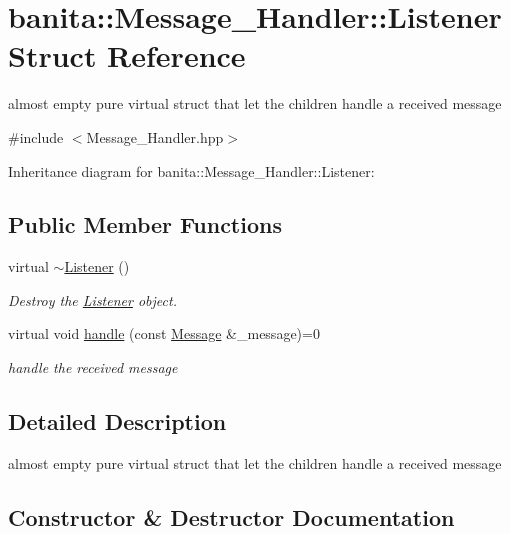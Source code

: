 \hypertarget{structbanita_1_1_message___handler_1_1_listener}{}\section{banita\+::Message\+\_\+\+Handler\+::Listener Struct Reference}
\label{structbanita_1_1_message___handler_1_1_listener}


almost empty pure virtual struct that let the children handle a received message  




{\ttfamily \#include $<$Message\+\_\+\+Handler.\+hpp$>$}



Inheritance diagram for banita\+::Message\+\_\+\+Handler\+::Listener\+:
\subsection*{Public Member Functions}
\begin{DoxyCompactItemize}
\item 
virtual \mbox{\hyperlink{structbanita_1_1_message___handler_1_1_listener_aa35b0cfb544e9353f6629d87fcc1799d}{$\sim$\+Listener}} ()
\begin{DoxyCompactList}\small\item\em Destroy the \mbox{\hyperlink{structbanita_1_1_message___handler_1_1_listener}{Listener}} object. \end{DoxyCompactList}\item 
virtual void \mbox{\hyperlink{structbanita_1_1_message___handler_1_1_listener_a2dfde040fbc7c8d2f17c6ba52722b749}{handle}} (const \mbox{\hyperlink{classbanita_1_1_message}{Message}} \&\+\_\+message)=0
\begin{DoxyCompactList}\small\item\em handle the received message \end{DoxyCompactList}\end{DoxyCompactItemize}


\subsection{Detailed Description}
almost empty pure virtual struct that let the children handle a received message 



\subsection{Constructor \& Destructor Documentation}
\mbox{\label{structbanita_1_1_message___handler_1_1_listener_aa35b0cfb544e9353f6629d87fcc1799d}} 
